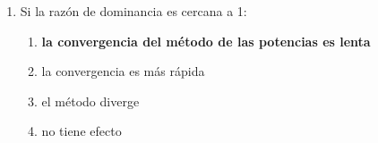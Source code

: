 \begin{enumerate}[label=\textbf{\arabic*.},leftmargin=*,itemsep=8pt]
	\item Si la razón de dominancia es cercana a 1:
	\begin{enumerate}[label=\alph*)]
		\item {\bfseries\boldmath\color{red} la convergencia del método de las potencias es lenta} 
		\item la convergencia es más rápida
		\item el método diverge 
		
		\item no tiene efecto
	\end{enumerate}
	
\end{enumerate}